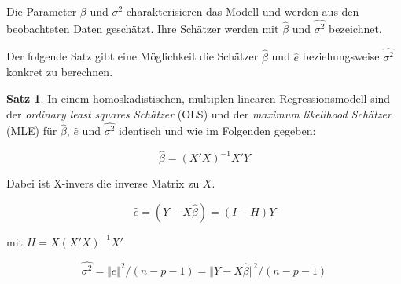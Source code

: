 \documentclass[12pt,a4paper]{article}
\theoremstyle{definition}
\theoremstyle{definition}
\newtheorem{Satz}[Definition]{Satz}
\theoremstyle{definition}
\theoremstyle{definition}
\begin{document}
Die Parameter $\beta$ und $\sigma^2$ charakterisieren das Modell und werden aus den beobachteten Daten geschätzt. Ihre Schätzer werden mit $\hat{\beta}$ und $\widehat{\sigma^2}$ bezeichnet.

Der folgende Satz gibt eine Möglichkeit die Schätzer $\hat{\beta}$ und $\hat{e}$ beziehungsweise $\widehat{\sigma^2}$ konkret zu berechnen.

\begin{Satz}
\label{erster Satz}
In einem homoskadistischen, multiplen linearen Regressionsmodell sind der \textit{ordinary least squares Schätzer} (OLS) und der \textit{maximum likelihood Schätzer} (MLE) für $\hat{\beta}$, $\hat{e}$ und $\widehat{\sigma^2}$ identisch und wie im Folgenden gegeben:

\begin{equation} \label{beta}
\hat{\beta} = (X'X)^{-1} X' Y
\end{equation}

Dabei ist \gls{X-invers} die inverse Matrix zu $X$.

\begin{equation} \label{e}
\hat{e} = (Y-X \hat{\beta}) = (I-H)Y
\end{equation}

mit $H=X(X'X)^{-1}X'$

\begin{equation} \label{sigma}
\widehat{\sigma^2} = \Vert \hat{e} \Vert^{2} / (n-p-1) = \Vert Y - X \hat{\beta} \Vert^{2} / (n-p-1)
\end{equation}

\end{Satz}
\end{document}
